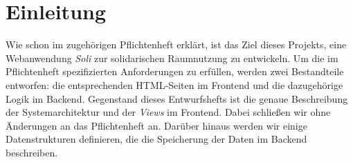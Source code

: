 
\chapter{Einleitung}
\label{ch:preface}


Wie schon im zugehörigen Pflichtenheft erklärt, ist das Ziel dieses Projekts, eine Webanwendung \textit{Soli} zur solidarischen Raumnutzung zu entwickeln.
Um die im Pflichtenheft spezifizierten Anforderungen zu erfüllen, werden zwei Bestandteile entworfen: die entsprechenden HTML-Seiten im Frontend und die dazugehörige Logik im Backend.
Gegenstand dieses Entwurfshefts ist die genaue Beschreibung der Systemarchitektur und der \textit{Views} im Frontend. Dabei schließen wir ohne Änderungen an das Pflichtenheft an.
Darüber hinaus werden wir einige Datenstrukturen definieren, die die Speicherung der Daten im Backend beschreiben.
